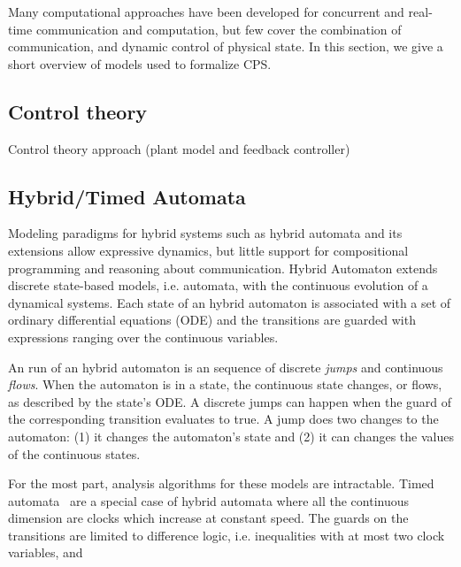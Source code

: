 \documentclass[
graybox,
envcountchap
]{svmult}
\begin{document}
\begin{bibunit}
Many computational approaches have been developed for concurrent and real-time communication and computation, but few cover the combination of communication, and dynamic control of physical state.
In this section, we give a short overview of models used to formalize CPS.

    \subsection{Control theory}

    Control theory approach (plant model and feedback controller)

    \subsection{Hybrid/Timed Automata}

Modeling paradigms for hybrid systems such as hybrid automata and its extensions \cite{DBLP:conf/lics/Henzinger96,AlurGLS06,DBLP:journals/iandc/LynchSV03} allow expressive dynamics, but little support for compositional programming and reasoning about communication.
Hybrid Automaton extends discrete state-based models, i.e. automata, with the continuous evolution of a dynamical systems.
Each state of an hybrid automaton is associated with a set of ordinary differential equations (ODE) and the transitions are guarded with expressions ranging over the continuous variables.

An run of an hybrid automaton is an sequence of discrete \emph{jumps} and continuous \emph{flows}.
When the automaton is in a state, the continuous state changes, or flows, as described by the state's ODE.
A discrete jumps can happen when the guard of the corresponding transition evaluates to true.
A jump does two changes to the automaton: (1) it changes the automaton's state and (2) it can changes the values of the continuous states.


For the most part, analysis algorithms for these models are intractable.
Timed automata~\cite{DBLP:journals/tcs/AlurD94} are a special case of hybrid automata where all the continuous dimension are clocks which increase at constant speed.
The guards on the transitions are limited to difference logic, i.e. inequalities with at most two clock variables, and 



\end{bibunit}
\end{document}
